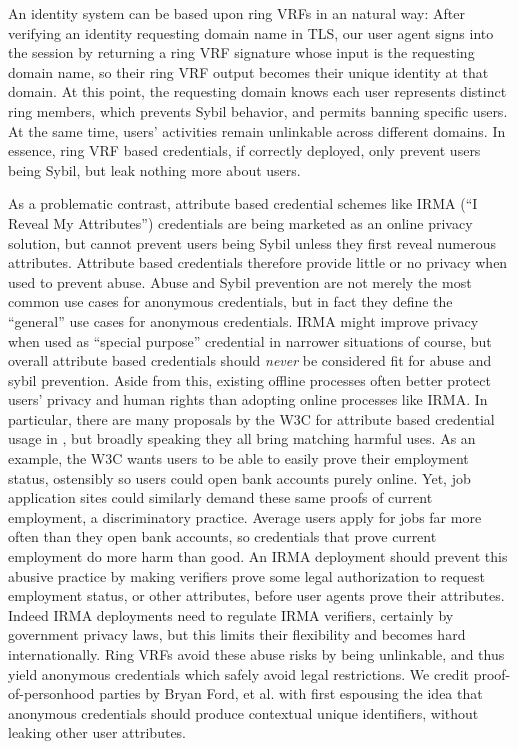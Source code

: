 An identity system can be based upon ring VRFs in an natural way:
After verifying an identity requesting domain name in TLS,
our user agent signs into the session by returning a ring VRF
signature whose input is the requesting domain name, so their
ring VRF output becomes their unique identity at that domain.
At this point, the requesting domain knows each user represents
distinct ring members, which prevents Sybil behavior, and permits
banning specific users.
At the same time, users' activities remain unlinkable across different
domains.
In essence, ring VRF based credentials, if correctly deployed, only
prevent users being Sybil, but leak nothing more about users.  

As a problematic contrast, attribute based credential schemes like
IRMA (``I Reveal My Attributes'') credentials \cite{IRMAcredentials}
are being marketed as an online privacy solution, but cannot prevent
users being Sybil unless they first reveal numerous attributes.
Attribute based credentials therefore provide little or no privacy
when used to prevent abuse.
Abuse and Sybil prevention are not merely the most common use cases for
anonymous credentials, but in fact they define the ``general'' use cases for
anonymous credentials.
IRMA might improve privacy when used as ``special purpose'' credential 
in narrower situations of course, but overall attribute based credentials
should {\it never} be considered fit for abuse and sybil prevention.
Aside from this, existing offline processes often better protect users'
privacy and human rights than adopting online processes like IRMA.
In particular, there are many proposals by the W3C for attribute based
credential usage in \cite{w3c_vc_use_cases}, but broadly speaking they
all bring matching harmful uses. %
As an example, the W3C wants users to be able to easily prove their
employment status, ostensibly so users could open bank accounts purely
online.  Yet, job application sites could similarly demand these same
proofs of current employment, a discriminatory practice.
Average users apply for jobs far more often than they open bank accounts,
so credentials that prove current employment do more harm than good.
An IRMA deployment should prevent this abusive practice by making
verifiers prove some legal authorization to request employment status,
or other attributes, before user agents prove their attributes.
Indeed IRMA deployments need to regulate IRMA verifiers, certainly by
government privacy laws,
but this limits their flexibility and becomes hard internationally.
Ring VRFs avoid these abuse risks by being unlinkable, and thus
yield anonymous credentials which safely avoid legal restrictions.
We credit proof-of-personhood parties by Bryan Ford, et al. \cite{pop2008,pop2017}
with first espousing the idea that anonymous credentials should produce
contextual unique identifiers, without leaking other user attributes.

